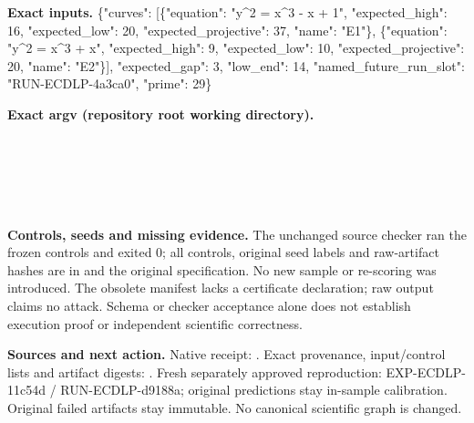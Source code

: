 \documentclass[10pt]{article}
\begin{document}
\textbf{Exact inputs.} \{"curves": [\{"equation": "y\textasciicircum{}2 = x\textasciicircum{}3 - x + 1", "expected\_high": 16, "expected\_low": 20, "expected\_projective": 37, "name": "E1"\}, \{"equation": "y\textasciicircum{}2 = x\textasciicircum{}3 + x", "expected\_high": 9, "expected\_low": 10, "expected\_projective": 20, "name": "E2"\}], "expected\_gap": 3, "low\_end": 14, "named\_future\_run\_slot": "RUN-ECDLP-4a3ca0", "prime": 29\}

\textbf{Exact argv (repository root working directory).}\\
{\footnotesize {}\\
\\
\\
\\
\\
}

\textbf{Controls, seeds and missing evidence.} The unchanged source checker ran the frozen controls and exited 0; all controls, original seed labels and raw-artifact hashes are in  and the original specification. No new sample or re-scoring was introduced. The obsolete manifest lacks a certificate declaration; raw output claims no attack. Schema or checker acceptance alone does not establish execution proof or independent scientific correctness.

\textbf{Sources and next action.} Native receipt: . Exact provenance, input/control lists and artifact digests: . Fresh separately approved reproduction: EXP-ECDLP-11c54d / RUN-ECDLP-d9188a; original predictions stay in-sample calibration. Original failed artifacts stay immutable. No canonical scientific graph is changed.
\end{document}
